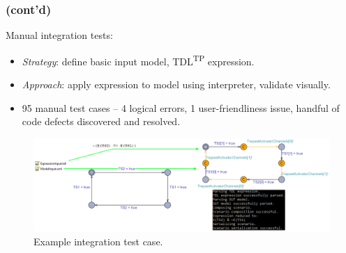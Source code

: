 \documentclass{beamer}
\newcommand{\recallframetitle}{}
\newcommand{\frametitlecont}{%
    \frametitle{\recallframetitle{} (cont'd)}%
}
\newcommand{\pauseafteritemize}{\pause[\thebeamerpauses]}
\newcommand{\TDLTP}{\texorpdfstring{TDL\textsuperscript{TP}}{TDL(TP)}}
\begin{document}
    \begin{frame}
        \frametitlecont{}
        \par Manual integration tests:
        \begin{itemize}[<+->]
            \item \textit{Strategy}: define basic input model, \TDLTP{} expression.
            \item \textit{Approach}: apply expression to model using interpreter, validate visually.
            \item 95 manual test cases -- 4 logical errors, 1 user-friendliness issue, handful of code defects discovered and resolved.
        \end{itemize}
        \pauseafteritemize
        \begin{figure}
            \includegraphics[width=\textwidth]{images/presentation/ManualTestCase.png}
            \caption{Example integration test case.}
            \label{fig:integration_test_case}
        \end{figure}
    \end{frame}

\end{document}

